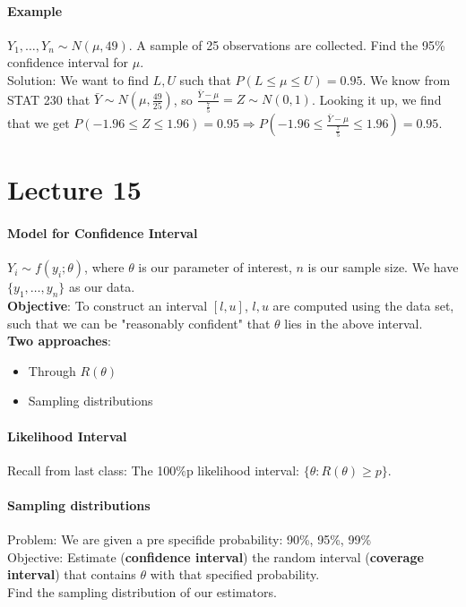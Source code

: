 \documentclass[10pt,letter]{article}
\theoremstyle{plain}
\theoremstyle{definition}
\begin{document}
\paragraph{Example}
$Y_1,\ldots,Y_n\sim N(\mu,49)$. A sample of 25 observations are collected. Find the 95\% confidence interval for $\mu$. \\ 
Solution: We want to find $L,U$ such that $P(L\leq\mu\leq U)=0.95$. We know from STAT 230 that $\bar{Y}\sim N(\mu,\frac{49}{25})$, so $\frac{\bar{Y}-\mu}{\frac{7}{5}}=Z\sim N(0,1)$. Looking it up, we find that we get $P(-1.96\leq Z\leq 1.96)=0.95\Rightarrow P(-1.96\leq \frac{\bar{Y}-\mu}{\frac{7}{5}}\leq1.96)=0.95$. 

\section*{Lecture 15}
\paragraph{Model for Confidence Interval}
$Y_i\sim f(y_i;\theta)$, where $\theta$ is our parameter of interest, $n$ is our sample size. We have $\{y_1,\ldots,y_n\}$ as our data. \\ 
\textbf{Objective}: To construct an interval $[l,u]$, $l,u$ are computed using the data set, such that we can be "reasonably confident" that $\theta$ lies in the above interval. \\ 
\textbf{Two approaches}: 
\begin{itemize}
    \item Through $R(\theta)$
    \item Sampling distributions
\end{itemize}

\paragraph{Likelihood Interval}
Recall from last class: The 100\%p likelihood interval: $\{\theta:R(\theta)\geq p\}$. 

\paragraph{Sampling distributions}
Problem: We are given a pre specifide probability: 90\%, 95\%, 99\%\\ 
Objective: Estimate (\textbf{confidence interval}) the random interval (\textbf{coverage interval}) that contains $\theta$  with that specified probability.\\ 
Find the sampling distribution of our estimators. 
\end{document}

